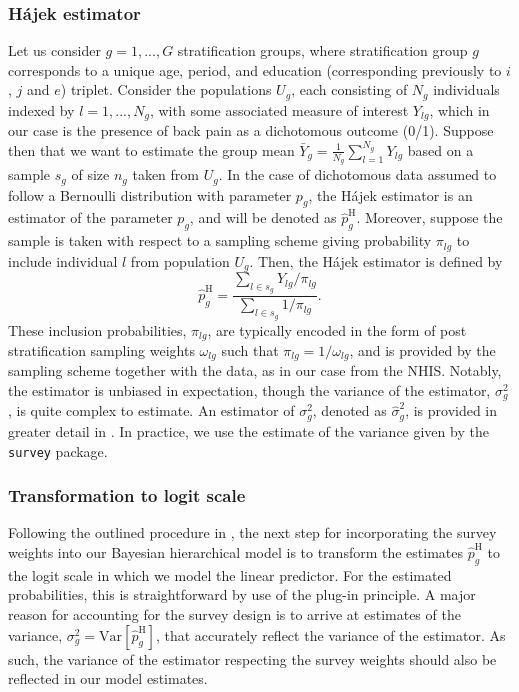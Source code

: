 \subsubsection{Hájek estimator}
\label{section:application2:hajek}
Let us consider $g=1,...,G$ stratification groups, where stratification group $g$ corresponds to a unique age, period, and education (corresponding previously to $i$, $j$ and $e$) triplet. Consider the populations $U_{g}$, each consisting of $N_{g}$ individuals indexed by $l=1,...,N_{g}$, with some associated measure of interest $Y_{lg}$, which in our case is the presence of back pain as a dichotomous outcome (0/1). Suppose then that we want to estimate the group mean $\bar{Y}_{g}= \frac{1}{N_{g}}\sum_{l=1}^{N_{g}}Y_{lg}$ based on a sample $s_{g}$ of size $n_{g}$ taken from $U_{g}$. In the case of dichotomous data assumed to follow a Bernoulli distribution with parameter $p_{g}$, the Hájek estimator is an estimator of the parameter $p_{g}$, and will be denoted as $\hat{p}^{\text{H}}_{g}$. Moreover, suppose the sample is taken with respect to a sampling scheme giving probability $\pi_{lg}$ to include individual $l$ from population $U_{g}$. Then, the Hájek estimator \citep{hajek1971comment} is defined by 
\begin{equation}
    \hat{p}^{\text{H}}_{g} = \frac{\sum_{l\in s_{g}}Y_{lg}/\pi_{lg}}{\sum_{l\in s_{g}}1/\pi_{lg}}.
    \label{eqn:hajek}
\end{equation}
These inclusion probabilities, $\pi_{lg}$, are typically encoded in the form of post stratification sampling weights $\omega_{lg}$ such that $\pi_{lg} = 1/\omega_{lg}$, and is provided by the sampling scheme together with the data, as in our case from the NHIS. Notably, the estimator is unbiased in expectation, though the variance of the estimator, $\sigma_g^2$, is quite complex to estimate. An estimator of $\sigma_g^2$, denoted as $\hat{\sigma}_g^2$, is provided in greater detail in \cite{hajekVariance}. In practice, we use the estimate of the variance given by the \texttt{survey} package. 

\subsubsection{Transformation to logit scale}
\label{section:application2:logit}
Following the outlined procedure in \cite{SurveyDesignMercer}, the next step for incorporating the survey weights into our Bayesian hierarchical model is to transform the estimates $\hat{p}^{\text{H}}_{g}$ to the logit scale in which we model the linear predictor. For the estimated probabilities, this is straightforward by use of the plug-in principle. A major reason for accounting for the survey design is to arrive at estimates of the variance, $\sigma_g^2 = \text{Var}[\hat{p}^{\text{H}}_{g}]$, that accurately reflect the variance of the estimator. As such, the variance of the estimator respecting the survey weights should also be reflected in our model estimates. 

